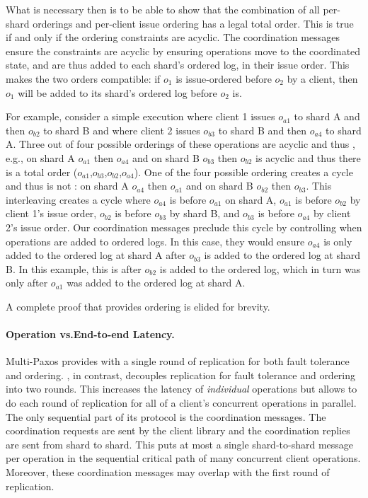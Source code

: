What is necessary then is to be able to show that the combination of all per-shard orderings and per-client issue ordering has a legal total order.
This is true if and only if the ordering constraints are acyclic.
The coordination messages ensure the constraints are acyclic by ensuring operations move to the coordinated state, and are thus added to each shard's ordered log, in their issue order.
This makes the two orders compatible: if $o_1$ is issue-ordered before $o_2$ by a client, then $o_1$ will be added to its shard's ordered log before $o_2$ is.

For example, consider a simple execution where client 1 issues $o_{a1}$ to shard A and then $o_{b2}$ to shard B and where client 2 issues $o_{b3}$ to shard B and then $o_{a4}$ to shard A.
Three out of four possible orderings of these operations are acyclic and thus \mdl{},
e.g., on shard A $o_{a1}$ then $o_{a4}$ and on shard B $o_{b3}$ then $o_{b2}$ is acyclic and thus there is a total order ($o_{a1}$,$o_{b3}$,$o_{b2}$,$o_{a4}$).
One of the four possible ordering creates a cycle and thus is not \mdl{}:
on shard A $o_{a4}$ then $o_{a1}$ and on shard B $o_{b2}$ then $o_{b3}$.
This interleaving creates a cycle where $o_{a4}$ is before $o_{a1}$ on shard A, $o_{a1}$ is before $o_{b2}$ by client 1's issue order, $o_{b2}$ is before $o_{b3}$ by shard B, and $o_{b3}$ is before $o_{a4}$ by client 2's issue order.
Our coordination messages preclude this cycle by controlling when operations are added to ordered logs.
In this case, they would ensure $o_{a4}$ is only added to the ordered log at shard A after $o_{b3}$ is added to the ordered log at shard B. In this example, this is after $o_{b2}$ is added to the ordered log, which in turn was only after $o_{a1}$ was added to the ordered log at shard A.

A complete proof that \sys{} provides \Mdl{} ordering is elided for brevity.

\paragraph{Operation vs.\@ End-to-end Latency.}
Multi-Paxos provides \sdl{} with a single round of replication for both fault
tolerance and ordering.  \sys{}, in contrast, decouples replication for fault
tolerance and ordering into two rounds.  This increases the latency of
\textit{individual} operations but allows \sys{} to do each round of
replication for all of a client's concurrent operations in parallel. The only
sequential part of its protocol is the coordination messages.  The
coordination requests are sent by the client library and the coordination
replies are sent from shard to shard.  This puts at most a single shard-to-shard
message per operation in the sequential critical path of many concurrent client
operations. Moreover, these coordination messages may overlap with the first
round of replication.

